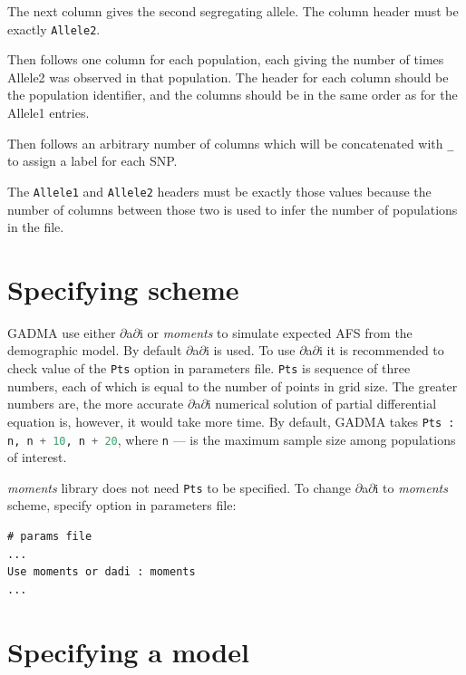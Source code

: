 \documentclass[12pt]{article}
\makeatletter
\newcommand{\dadi}{$\partial$a$\partial$i\xspace}
\newcommand{\moments}{\textit{moments}\xspace}
\newcommand{\py}[1]{\lstinline[language=Python, showstringspaces=False]@#1@}
\makeatother
\begin{document}
The next column gives the second segregating allele.
The column header must be exactly \py{Allele2}.

Then follows one column for each population, each giving the number of times Allele2 was observed in that population.
The header for each column should be the population identifier, and the columns should be in the same order as for the Allele1 entries.

Then follows an arbitrary number of columns which will be concatenated with \py{_} to assign a label for each SNP.

The \py{Allele1} and \py{Allele2} headers must be exactly those values because the number of columns between those two is used to infer the number of populations in the file.

\section{Specifying scheme}
GADMA use either \dadi or \moments to simulate expected AFS from the demographic model. By default \dadi is used. To use \dadi it is recommended to check value of the \py{Pts} option in parameters file. \py{Pts} is sequence of three numbers, each of which is equal to the number of points in grid size. The greater numbers are, the more accurate \dadi numerical solution of partial differential equation is, however, it would take more time. By default, GADMA takes \py{Pts : n, n + 10, n + 20}, where \py{n} --- is the maximum sample size among populations of interest. 

\moments library does not need \py{Pts} to be specified. To change \dadi to \moments scheme, specify option in parameters file:

\begin{lstlisting}
# params file
...
Use moments or dadi : moments
...
\end{lstlisting}

\section{Specifying a model}
\end{document}
